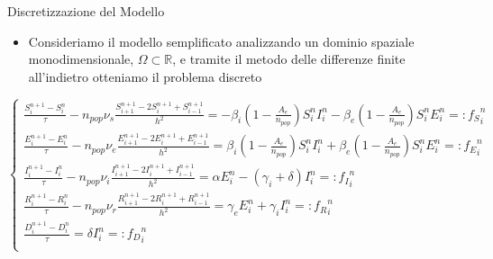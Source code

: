 \documentclass[serif]{beamer}
\newcommand{\R}{\mathbb{R}}
\begin{document}
\begin{frame}{Discretizzazione del Modello }
\begin{itemize}
    \item Consideriamo il modello semplificato analizzando un dominio spaziale monodimensionale, \(\Omega \subset \R  \), e tramite il metodo delle differenze finite all'indietro otteniamo il problema discreto 
\end{itemize}
\begin{tiny}

\begin{equation*}
\begin{cases}
\frac{S_i^{n+1} - S_i^n}{\tau} - n_{pop} \nu_s \frac{S_{i+1}^{n+1} - 2S_i^{n+1} + S_{i-1}^{n+1}}{h^2} =  - \beta_i \left(1 - \frac{A_e}{n_{pop}} \right) S_i^n I_i^n - \beta_e \left(1 - \frac{A_e}{n_{pop}} \right) S_i^n E_i^n = :{f_S}_i^n \\

\frac{E_i^{n+1} - E_i^n}{\tau} - n_{pop} \nu_e \frac{E_{i+1}^{n+1} - 2E_i^{n+1} + E_{i-1}^{n+1}}{h^2} =   \beta_i \left(1 - \frac{A_e}{n_{pop}} \right) S_i^n I_i^n + \beta_e \left(1 - \frac{A_e}{n_{pop}} \right) S_i^n E_i^n = :{f_E}_i^n \\
\frac{I_i^{n+1} - I_i^n}{\tau}  - n_{pop} \nu_i \frac{I_{i+1}^{n+1} - 2I_i^{n+1} + I_{i-1}^{n+1}}{h^2} =   \alpha E_i^n - \left( \gamma_i + \delta \right) I_i^n = :{f_I}_i^n \\
\frac{R_i^{n+1} - R_i^n}{\tau} - n_{pop} \nu_r \frac{R_{i+1}^{n+1} - 2R_i^{n+1} + R_{i-1}^{n+1}}{h^2} =  \gamma_e E_i^n + \gamma_i I_i^n = :{f_R}_i^n \\
\frac{D_i^{n+1} - D_i^n}{\tau} =  \delta I_i^n =:{f_D}_i^n \\
\end{cases}
\end{equation*}
\end{tiny}
\end{frame}
\end{document}
